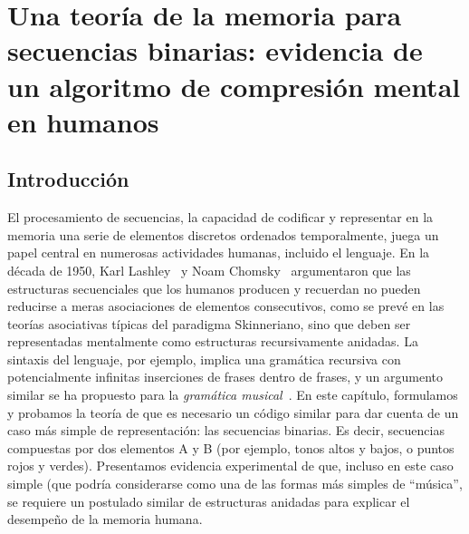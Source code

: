 

\chapter{Una teoría de la memoria para secuencias binarias: evidencia de un algoritmo de compresión mental en humanos} \label{chapter:BIN}

\section{Introducción}


El procesamiento de secuencias, la capacidad de codificar y representar en la memoria una serie de elementos discretos ordenados temporalmente, juega un papel central en numerosas actividades humanas, incluido el lenguaje. En la década de 1950, Karl Lashley~\cite{f1} y Noam Chomsky~\cite{f2} argumentaron que las estructuras secuenciales que los humanos producen y recuerdan no pueden reducirse a meras asociaciones de elementos consecutivos, como se prevé en las teorías asociativas típicas del paradigma Skinneriano, sino que deben ser representadas mentalmente como estructuras recursivamente anidadas. La sintaxis del lenguaje, por ejemplo, implica una gramática recursiva con potencialmente infinitas inserciones de frases dentro de frases, y un argumento similar se ha propuesto para la \textit{gramática musical}~\cite{f3}. En este capítulo, formulamos y probamos la teoría de que es necesario un código similar para dar cuenta de un caso más simple de representación: las secuencias binarias. Es decir, secuencias compuestas por dos elementos A y B (por ejemplo, tonos altos y bajos, o puntos rojos y verdes). Presentamos evidencia experimental de que, incluso en este caso simple (que podría considerarse como una de las formas más simples de ``música'', se requiere un postulado similar de estructuras anidadas para explicar el desempeño de la memoria humana.

